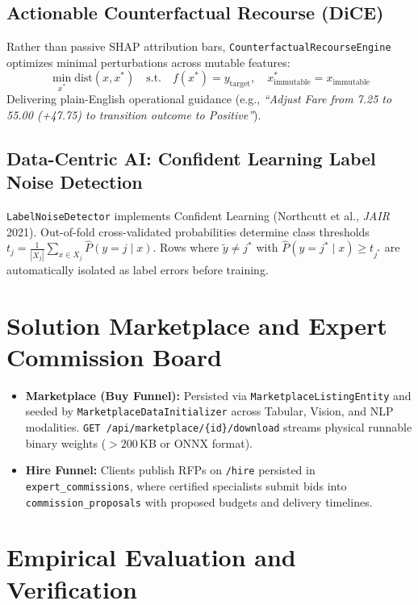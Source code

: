 \documentclass[11pt,a4paper]{article}
\begin{document}
\subsection{Actionable Counterfactual Recourse (DiCE)}
Rather than passive SHAP attribution bars, \texttt{CounterfactualRecourseEngine} optimizes minimal perturbations across mutable features:
\begin{equation}
\min_{x^*} \text{dist}(x, x^*) \quad \text{s.t.} \quad f(x^*) = y_{\text{target}}, \quad x_{\text{immutable}}^* = x_{\text{immutable}}
\end{equation}
Delivering plain-English operational guidance (e.g., \textit{``Adjust Fare from 7.25 to 55.00 (+47.75) to transition outcome to Positive''}).

\subsection{Data-Centric AI: Confident Learning Label Noise Detection}
\texttt{LabelNoiseDetector} implements Confident Learning (Northcutt et al., \textit{JAIR} 2021). Out-of-fold cross-validated probabilities determine class thresholds $t_j = \frac{1}{|X_j|} \sum_{x \in X_j} \hat{P}(y=j \mid x)$. Rows where $\tilde{y} \neq j^*$ with $\hat{P}(y=j^* \mid x) \ge t_{j^*}$ are automatically isolated as label errors before training.

\section{Solution Marketplace and Expert Commission Board}
\begin{itemize}[leftmargin=0.7cm]
  \item \textbf{Marketplace (Buy Funnel):} Persisted via \texttt{MarketplaceListingEntity} and seeded by \texttt{MarketplaceDataInitializer} across Tabular, Vision, and NLP modalities. \texttt{GET /api/marketplace/\{id\}/download} streams physical runnable binary weights ($>200$\,KB or ONNX format).
  \item \textbf{Hire Funnel:} Clients publish RFPs on \texttt{/hire} persisted in \texttt{expert\_commissions}, where certified specialists submit bids into \texttt{commission\_proposals} with proposed budgets and delivery timelines.
\end{itemize}

\section{Empirical Evaluation and Verification}
\end{document}

